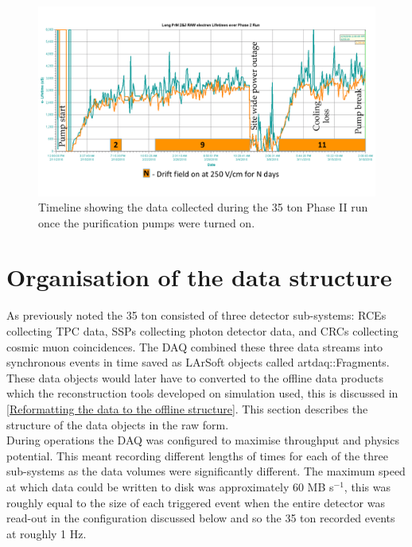 \begin{figure}[h!]
  \centering
  \includegraphics[width=1.0\textwidth]{DataCollected}
  \caption[The 35 ton data sample]{Timeline showing the data collected during the 35 ton Phase II run once the purification pumps were turned on.}
  \label{fig:DataCollected}  
\end{figure}


\section{Organisation of the data structure} \label{Organisation of the data structure} %
As previously noted the 35 ton consisted of three detector sub-systems: RCEs collecting TPC data, SSPs collecting photon detector data, and CRCs collecting cosmic muon coincidences. The DAQ combined these three data streams into synchronous events in time saved as LArSoft objects called artdaq::Fragments. These data objects would later have to converted to the offline data products which the reconstruction tools developed on simulation used, this is discussed in \ref{Reformatting the data to the offline structure}. This section describes the structure of the data objects in the raw form.\\

During operations the DAQ was configured to maximise throughput and physics potential. This meant recording different lengths of times for each of the three sub-systems as the data volumes were significantly different. The maximum speed at which data could be written to disk was approximately 60 MB s$^{-1}$, this was roughly equal to the size of each triggered event when the entire detector was read-out in the configuration discussed below and so the 35 ton recorded events at roughly 1 Hz.\\

